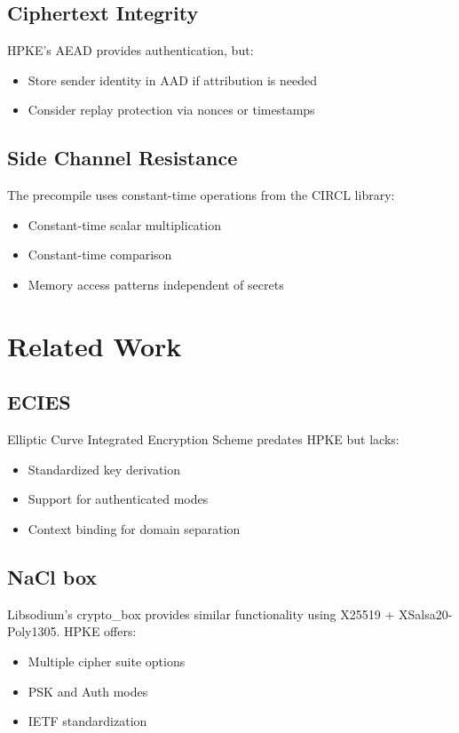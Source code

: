\documentclass[11pt,a4paper]{article}
\theoremstyle{definition}
\begin{document}
\subsection{Ciphertext Integrity}

HPKE's AEAD provides authentication, but:
\begin{itemize}
\item Store sender identity in AAD if attribution is needed
\item Consider replay protection via nonces or timestamps
\end{itemize}

\subsection{Side Channel Resistance}

The precompile uses constant-time operations from the CIRCL library:
\begin{itemize}
\item Constant-time scalar multiplication
\item Constant-time comparison
\item Memory access patterns independent of secrets
\end{itemize}

\section{Related Work}

\subsection{ECIES}

Elliptic Curve Integrated Encryption Scheme predates HPKE but lacks:
\begin{itemize}
\item Standardized key derivation
\item Support for authenticated modes
\item Context binding for domain separation
\end{itemize}

\subsection{NaCl box}

Libsodium's crypto\_box provides similar functionality using X25519 + XSalsa20-Poly1305. HPKE offers:
\begin{itemize}
\item Multiple cipher suite options
\item PSK and Auth modes
\item IETF standardization
\end{itemize}
\end{document}
